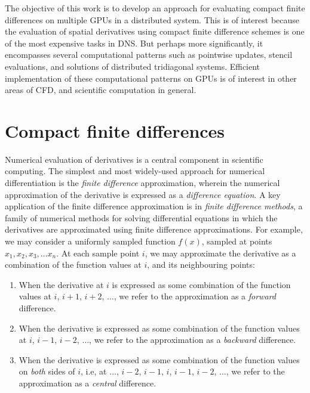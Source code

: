 The objective of this work is to develop an
approach for evaluating
compact finite differences
on multiple GPUs in a distributed system.
This is of interest because
the evaluation of spatial derivatives using
compact finite difference schemes is one of the most
expensive tasks in DNS.
But perhaps more significantly,
it encompasses several computational patterns
such as pointwise updates, stencil evaluations,
and solutions of distributed tridiagonal systems.
Efficient implementation of these computational patterns
on GPUs is of interest in other areas of CFD,
and scientific computation in general.

\section{Compact finite differences}

Numerical evaluation of derivatives is a central component
in scientific computing.
The simplest and most widely-used approach for numerical differentiation
is the \emph{finite difference} approximation,
wherein the numerical approximation of the derivative
is expressed as a \emph{difference equation}.
A key application of the finite difference approximation
is in \emph{finite difference methods},
a family of numerical methods for solving differential equations
in which the derivatives are approximated using
finite difference approximations.
%
For example, we may consider a uniformly sampled
function $f(x)$,
sampled at points $x_1, x_2, x_3, \hdots x_n$.
At each sample point $i$, we may approximate the derivative as
a combination of the function values at
$i$, and its neighbouring points:

\begin{enumerate}
    \item When the derivative at $i$ is expressed
        as some combination of the function values
        at $i$, $i+1$, $i+2$, $\hdots$,
        we refer to the approximation as a
        \emph{forward} difference.
        
    \item When the derivative is expressed as
        some combination of the function values
        at $i$, $i-1$, $i-2$, $\hdots$,
        we refer to the approximation as a
        \emph{backward} difference.

    \item When the derivative is expressed as
        some combination of the function values
        on \emph{both} sides of $i$, i.e,
        at $\hdots$, $i-2$, $i-1$, $i$, $i-1$, $i-2$, $\hdots$,
        we refer to the approximation as a
        \emph{central} difference.
\end{enumerate}

